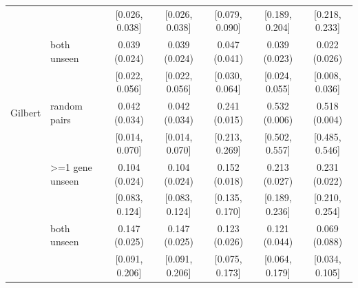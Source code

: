 \begin{tabular}{ll|ccccc}
 & & \scriptsize[0.026, 0.038] & \scriptsize[0.026, 0.038] & \scriptsize[0.079, 0.090] & \scriptsize[0.189, 0.204] & \scriptsize[0.218, 0.233] \\
 & both unseen & 0.039 (0.024) & 0.039 (0.024) & 0.047 (0.041) & 0.039 (0.023) & 0.022 (0.026) \\
 & & \scriptsize[0.022, 0.056] & \scriptsize[0.022, 0.056] & \scriptsize[0.030, 0.064] & \scriptsize[0.024, 0.055] & \scriptsize[0.008, 0.036] \\
\hline
Gilbert & random pairs & 0.042 (0.034) & 0.042 (0.034) & 0.241 (0.015) & 0.532 (0.006) & 0.518 (0.004) \\
 & & \scriptsize[0.014, 0.070] & \scriptsize[0.014, 0.070] & \scriptsize[0.213, 0.269] & \scriptsize[0.502, 0.557] & \scriptsize[0.485, 0.546] \\
 & >=1 gene unseen & 0.104 (0.024) & 0.104 (0.024) & 0.152 (0.018) & 0.213 (0.027) & 0.231 (0.022) \\
 & & \scriptsize[0.083, 0.124] & \scriptsize[0.083, 0.124] & \scriptsize[0.135, 0.170] & \scriptsize[0.189, 0.236] & \scriptsize[0.210, 0.254] \\
 & both unseen & 0.147 (0.025) & 0.147 (0.025) & 0.123 (0.026) & 0.121 (0.044) & 0.069 (0.088) \\
 & & \scriptsize[0.091, 0.206] & \scriptsize[0.091, 0.206] & \scriptsize[0.075, 0.173] & \scriptsize[0.064, 0.179] & \scriptsize[0.034, 0.105] \\
\hline
\end{tabular}